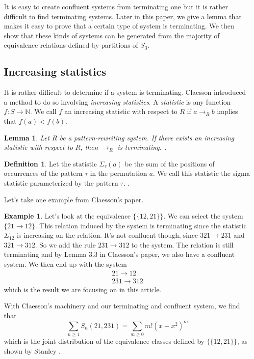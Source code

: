 \documentclass[a4paper, 11pt, english]{article}
\newcommand{\patternrule}{ \to \!}
\newtheorem{lemma}[theorem]{Lemma}
\theoremstyle{definition}
\newtheorem{definition}[theorem]{Definition}
\newtheorem{example}[theorem]{Example}
\newcommand{\Sym}{S}
\begin{document}
It is easy to create confluent systems from terminating one but it is rather difficult to find
terminating systems. Later in this paper, we give a lemma that makes it easy to prove that a certain
type of system is terminating. We then show that these kinds of systems can be generated from  the
majority of equivalence relations defined by partitions of $\Sym_3$.

\subsection{Increasing statistics}
It is rather difficult to determine if a system is terminating. Claesson introduced a method to
do so involving \emph{increasing statistics}.
A \emph{statistic} is any function $f : \Sym \to \mathbb{N}$. We call $f$ an increasing
statistic with respect to $R$ if $a \to_R b$ implies that $f(a) < f(b)$.

\begin{lemma}
    Let $R$ be a pattern-rewriting system. If there exists an increasing
    statistic with respect to $R$, then $\to_R$ is terminating.    
    \cite{claesson:2021}.
\end{lemma}

\begin{definition}
    Let the statistic $\Sigma_\tau(a)$ be the sum of the positions of occurrences of
    the pattern $\tau$ in the permutation $a$. We call this statistic the sigma statistic
    parameterized by the pattern $\tau$.
    \cite{claesson:2021}.
\end{definition}

Let's take one example from Claesson's paper.
\begin{example}
    Let's look at the equivalence $\{ \{ 12, 21 \} \}$. We can select the system $\{
        21 \to 12 \}$. This relation induced by the system is terminating since the statistic
    $\Sigma_{12}$ is increasing on the relation. It's not
    confluent though, since $321 \to 231$ and $321 \to 312$. So we add the rule
    $231 \patternrule 312$ to the system. The relation is still terminating and by Lemma
    3.3 in Claesson's paper, we also have a confluent system. We then end up with
    the system 
    \[
      \begin{matrix}
        21 \patternrule 12 \\
        231 \patternrule 312
      \end{matrix}
    \]
    which is the result we are focusing on in this article.

    With Claesson's machinery and our terminating and confluent system, we find that 
    \[
        \sum_{n \geq 1} \Sym_n(21, 231) = \sum_{m \geq 0} m!(x-x^2)^m
    \]
    which is the joint distribution of the equivalence classes defined by 
    $\{ \{ 12, 21 \} \}$, as shown by Stanley \cite{stanley:2012}.
\end{example}
\end{document}
